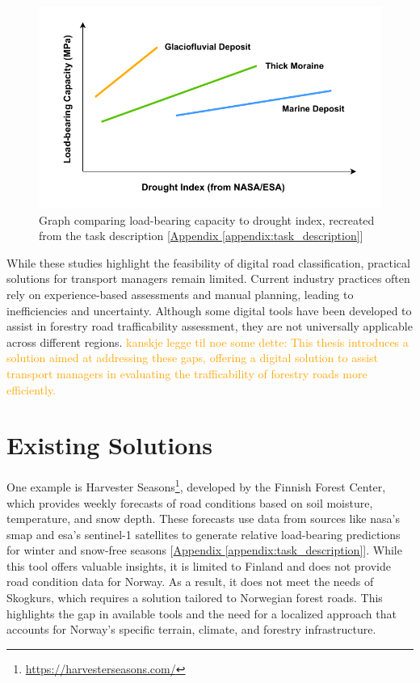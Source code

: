\begin{figure}[h]
    \centering
    \includegraphics[width=0.7\linewidth]{figures/bæreevne_tørkeindex.pdf}
    \caption[Graph comparing load-bearing capacity to drought index]{Graph comparing load-bearing capacity to drought index, recreated from the task description [\hyperref[appendix:task_description]{Appendix \ref*{appendix:task_description}}]}
    \label{fig:load_to_drought_graph}
\end{figure}

While these studies highlight the feasibility of digital road classification, practical solutions for transport managers remain limited. Current industry practices often rely on experience-based assessments and manual planning, leading to inefficiencies and uncertainty. Although some digital tools have been developed to assist in forestry road trafficability assessment, they are not universally applicable across different regions. \textcolor{orange}{kanskje legge til noe some dette: This thesis introduces a solution aimed at addressing these gaps, offering a digital solution to assist transport managers in evaluating the trafficability of forestry roads more efficiently.}

\section{Existing Solutions}

One example is Harvester Seasons\footnote{\url{https://harvesterseasons.com/}}, developed by the Finnish Forest Center, which provides weekly forecasts of road conditions based on soil moisture, temperature, and snow depth. These forecasts use data from sources like \acrshort{nasa}'s \gls{smap} and \acrshort{esa}'s \Gls{sentinel-1} satellites to generate relative load-bearing predictions for winter and snow-free seasons [\hyperref[appendix:task_description]{Appendix \ref*{appendix:task_description}}]. While this tool offers valuable insights, it is limited to Finland and does not provide road condition data for Norway. As a result, it does not meet the needs of Skogkurs, which requires a solution tailored to Norwegian forest roads. This highlights the gap in available tools and the need for a localized approach that accounts for Norway's specific terrain, climate, and forestry infrastructure.

